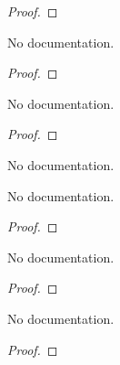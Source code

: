 \begin{proof}
    \leanok
\end{proof}

\begin{theorem}\label{Algebra.pow_mem_adjoin_singleton}
        \leanok
                No documentation.
    \end{theorem}

\begin{proof}
    \leanok
\end{proof}

\begin{theorem}\label{integer_valuation_eq}
        \leanok
                No documentation.
    \end{theorem}

\begin{proof}
    \leanok
\end{proof}

\begin{theorem}\label{integerAlgebraMap.monotone}
                No documentation.
    \end{theorem}

\begin{theorem}\label{integer_val_coe}
        \leanok
                No documentation.
    \end{theorem}

\begin{proof}
    \leanok
\end{proof}

\begin{theorem}\label{valuationSubring_val_coe}
        \leanok
                No documentation.
    \end{theorem}

\begin{proof}
    \leanok
\end{proof}

\begin{theorem}\label{integer_val_le_one}
        \leanok
                No documentation.
    \end{theorem}

\begin{proof}
    \leanok
\end{proof}

